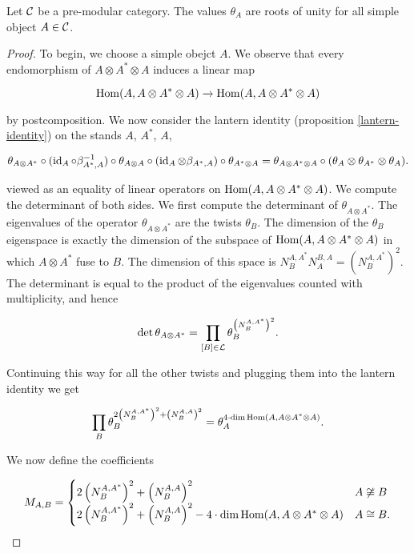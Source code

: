 \begin{thrm}\label{vafa-theorem} Let ${\mathcal C}$ be a pre-modular category. The values $\theta_{A}$ are roots of unity for all simple object $A\in {\mathcal C}$.
\end{thrm}
\begin{proof} To begin, we choose a simple obejct $A$. We observe that every endomorphism of $A\otimes A^*\otimes A$ induces a linear map

$$\operatorname{Hom}(A,A\otimes A^*\otimes A) \xrightarrow{} \operatorname{Hom}(A,A\otimes A^*\otimes A)$$

by postcomposition. We now consider the lantern identity (proposition \ref{lantern-identity}) on the stands $A$, $A^*$, $A$,

$$\theta_{A\otimes A^*}\circ (\operatorname{id}_A\circ \beta_{A^*,A}^{-1})\circ \theta_{A\otimes A}\circ (\operatorname{id}_A\otimes \beta_{A^*,A})\circ \theta_{A^*\otimes A} = \theta_{A\otimes A^*\otimes A}\circ (\theta_{A}\otimes \theta_{A^*}\otimes \theta_{A}).$$

viewed as an equality of linear operators on $\operatorname{Hom}(A,A\otimes A^*\otimes A)$. We compute the determinant of both sides. We first compute the determinant of $\theta_{A\otimes A^*}$. The eigenvalues of the operator $\theta_{A\otimes A^*}$ are the twists $\theta_{B}$. The dimension of the $\theta_{B}$ eigenspace is exactly the dimension of the subspace of $\operatorname{Hom}(A,A\otimes A^*\otimes A)$ in which $A\otimes A^*$ fuse to $B$. The dimension of this space is $N^{A,A^*}_{B}N^{B,A}_{A}=(N^{A,A^*}_{B})^2$. The determinant is equal to the product of the eigenvalues counted with multiplicity, and hence

$$\det \theta_{A\otimes A^*}= \prod_{[B]\in {\mathcal L}}\theta_{B}^{\left(N^{A,A^*}_{B}\right)^2}.$$

Continuing this way for all the other twists and plugging them into the lantern identity we get

$$\prod_{B}\theta_{B}^{2\left(N^{A,A^*}_{B}\right)^2+\left(N^{A,A}_{B}\right)^2}=\theta_{A}^{4\cdot \dim \operatorname{Hom}(A,A\otimes A^*\otimes A)}.$$

We now define the coefficients

$$
M_{A,B}=
\begin{cases}
2\left(N^{A,A^*}_{B}\right)^2+\left(N^{A,A}_{B}\right)^2 & A\not\cong B\\
2\left(N^{A,A^*}_{B}\right)^2+\left(N^{A,A}_{B}\right)^2 - 4\cdot \dim \operatorname{Hom}(A,A\otimes A^*\otimes A) & A\cong B.
\end{cases}
$$


\end{proof}
